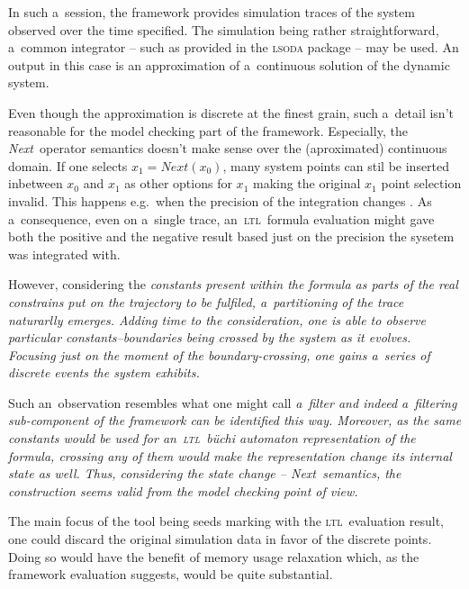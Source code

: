 \documentclass[12pt,oneside,draft]{fithesis}
\newcommand{\ltl}{\textsc{ltl}~}
\newcommand{\Next}{\emph{Next}~}
\begin{document}
In such a~session, the framework provides simulation traces of the system observed over
the time specified. The simulation being rather straightforward, a~common integrator -- such as provided in the \textsc{lsoda}
\cite{lsoda} package -- may be used.
An output in this case is an approximation of a~continuous solution of the dynamic system.

Even though the approximation is discrete at the finest grain, such a~detail isn't reasonable
for the model checking part of the framework. Especially, the \Next operator semantics doesn't make sense over the
(aproximated) continuous domain. If one selects $x_1 = Next(x_0)$, many system points can stil be inserted
inbetween $x_0$ and $x_1$ as other options for $x_1$ making the original $x_1$ point selection invalid.
This happens e.g.~when the precision of the integration changes \cite{integration}.
As a~consequence, even on a~single trace, an~\ltl formula evaluation might gave both the positive and the negative result
based just on the precision the sysetem was integrated with. 

However, considering the \em constants \rm present within the formula as parts of the real \em constrains \rm put on the 
trajectory to be fulfiled, a~partitioning of the trace naturarlly emerges. Adding time to the consideration, one is able to
observe particular constants--boundaries being crossed by the system as it evolves. \em Focusing just on the moment of
the boundary-crossing, one gains a~series of discrete events the system exhibits\rm{}.

Such an~observation resembles what one might call \em a~filter \rm and indeed a~filtering sub-component of the framework
can be identified this way. Moreover, as the same constants would be used for an~\ltl b\"{u}chi automaton representation of the formula, 
crossing any of them would make the representation change its internal state as well.
Thus, considering the state change -- \Next semantics, the construction seems valid from the model checking point of view.

The main focus of the tool being seeds marking with the \ltl evaluation result, one could discard the original simulation
data in favor of the discrete points.
Doing so would have the benefit of memory usage relaxation which, as the framework evaluation suggests, would be quite substantial.
\end{document}
